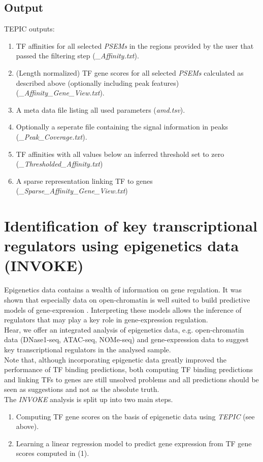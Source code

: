 \documentclass{article}
\begin{document}
\subsection{Output}
TEPIC outputs:
\begin{enumerate}
\item TF affinities for all selected \textit{PSEMs} in the regions provided by the user that passed the filtering step (\textit{\*\_Affinity.txt}). 
\item (Length normalized) TF gene scores for all selected \textit{PSEMs} calculated as described above (optionally including peak features) (\textit{\*\_Affinity\_Gene\_View.txt}). 
\item A meta data file listing all used parameters (\textit{amd.tsv}).
\item Optionally a seperate file containing the signal information in peaks (\textit{\*\_Peak\_Coverage.txt}). 
\item TF affinities with all values below an inferred threshold set to zero (\textit{\*\_Thresholded\_Affinity.txt})
\item A sparse representation linking TF to genes (\textit{\*\_Sparse\_Affinity\_Gene\_View.txt})
\end{enumerate}

\newpage
\section{Identification of key transcriptional regulators using epigenetics data (INVOKE)}
Epigenetics data contains a wealth of information on gene regulation. It was shown that especially
data on open-chromatin is well suited to build predictive models of gene-expression \cite{pmid27899623,pmid22955983,pmid25231769,pmid22954627}.
Interpreting these models allows the inference of regulators that may play a key role in gene-expression regulation.
\bigskip
\\Hear, we offer an integrated analysis of epigenetics data, e.g. open-chromatin data (DNase1-seq, ATAC-seq, NOMe-seq) and gene-expression data
to suggest key transcriptional regulators in the analysed sample.
\bigskip
\\Note that, although incorporating epigenetic data greatly improved the performance of TF binding predictions, both computing TF binding predictions and linking TFs to genes are still unsolved problems and all predictions
should be seen as suggestions and not as the absolute truth.
\bigskip
\\The \textit{INVOKE} analysis is split up into two main steps. 
\begin{enumerate}
\item Computing TF gene scores on the basis of epigenetic data using \textit{TEPIC} (see above).
\item Learning a linear regression model to predict gene expression from TF gene scores computed in (1).
\end{enumerate}
\end{document}
